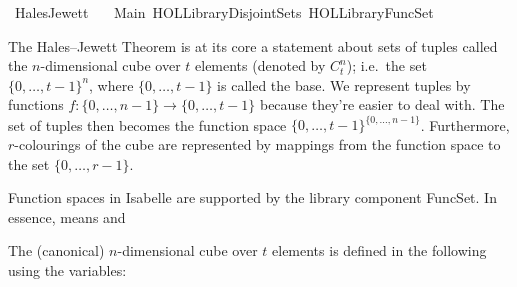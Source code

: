 %
\begin{isabellebody}%
%
%
\isadelimtheory
%
\endisadelimtheory
%
\isatagtheory
{}\isamarkupfalse%
\ {\isachardoublequoteopen}Hales{\isacharunderscore}{\kern0pt}Jewett{\isachardoublequoteclose}\isanewline
\ \ \ Main\ {\isachardoublequoteopen}HOL{\isacharminus}{\kern0pt}Library{\isachardot}{\kern0pt}Disjoint{\isacharunderscore}{\kern0pt}Sets{\isachardoublequoteclose}\ {\isachardoublequoteopen}HOL{\isacharminus}{\kern0pt}Library{\isachardot}{\kern0pt}FuncSet{\isachardoublequoteclose}\isanewline
{}%
\endisatagtheory
{\isafoldtheory}%
%
\isadelimtheory
%
\endisadelimtheory
%
\isadelimdocument
%
\endisadelimdocument
%
\isatagdocument
%
\isamarkuptrue%
%
\endisatagdocument
{\isafolddocument}%
%
\isadelimdocument
%
\endisadelimdocument
%
\begin{isamarkuptext}%
The Hales--Jewett Theorem is at its core a statement about sets of tuples called the $n$-dimensional cube over $t$ elements (denoted by $C^n_t$); i.e.\ the set $\{0,\ldots,t - 1\}^n$, where $\{0,\ldots,t - 1\}$ is called the base. 
We represent tuples by functions $f : \{0,\ldots,n - 1\} \rightarrow \{0,\ldots,t - 1\}$ because they're easier to deal with. The set of tuples then becomes the function space $\{0,\ldots,t - 1\}^{\{0,\ldots,n - 1\}}$.
Furthermore, $r$-colourings of the cube are represented by mappings from the function space to the set $\{0,\ldots, r-1\}$.%
\end{isamarkuptext}\isamarkuptrue%
%
\isadelimdocument
%
\endisadelimdocument
%
\isatagdocument
%
\isamarkuptrue%
%
\endisatagdocument
{\isafolddocument}%
%
\isadelimdocument
%
\endisadelimdocument
%
\begin{isamarkuptext}%
Function spaces in Isabelle are supported by the library component FuncSet.
  In essence,  means  and %
\end{isamarkuptext}\isamarkuptrue%
%
\begin{isamarkuptext}%
The (canonical) $n$-dimensional cube over $t$ elements is defined in the following using the variables:


\end{isamarkuptext}
\end{isabellebody}
